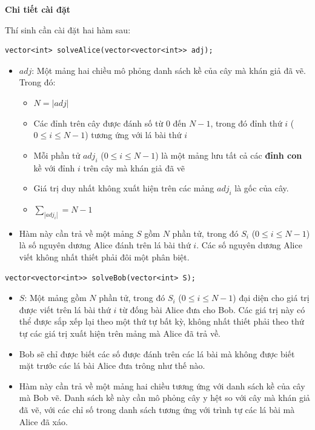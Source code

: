 \textbf{Chi tiết cài đặt}

Thí sinh cần cài đặt hai hàm sau:

\begin{lstlisting}
vector<int> solveAlice(vector<vector<int>> adj);
\end{lstlisting}

\begin{itemize}
   \item $adj$: Một mảng hai chiều mô phỏng danh sách kề của cây mà khán giả đã vẽ. Trong đó:
   \begin{itemize}
      \item $N=|adj|$
      \item Các đỉnh trên cây được đánh số từ $0$ đến $N-1$, trong đó đỉnh thứ $i$ ($0\le i\le N-1$) tương ứng với lá bài thứ $i$
      \item Mỗi phần tử $adj_i$ ($0\le i\le N-1$) là một mảng lưu tất cả các \textbf{đỉnh con} kề với đỉnh $i$ trên cây mà khán giả đã vẽ
      \item Giá trị duy nhất không xuất hiện trên các mảng $adj_i$ là gốc của cây.
      \item $\sum_{|adj_i|}=N-1$
   \end{itemize}
   \item Hàm này cần trả về một mảng $S$ gồm $N$ phần tử, trong đó $S_i$ ($0\le i\le N-1$) là số nguyên dương Alice đánh trên lá bài thứ $i$. Các số nguyên dương Alice viết không nhất thiết phải đôi một phân biệt.
\end{itemize}

\begin{lstlisting}
vector<vector<int>> solveBob(vector<int> S);
\end{lstlisting}

\begin{itemize}
   \item $S$: Một mảng gồm $N$ phần tử, trong đó $S_i$ ($0\le i\le N-1$) đại diện cho giá trị được viết trên lá bài thứ $i$ từ đống bài Alice đưa cho Bob. Các giá trị này có thể được sắp xếp lại theo một thứ tự bất kỳ, không nhất thiết phải theo thứ tự các giá trị xuất hiện trên mảng mà Alice đã trả về.
   \item Bob sẽ chỉ được biết các số được đánh trên các lá bài mà không được biết mặt trước các lá bài Alice đưa trông như thế nào.
   \item Hàm này cần trả về một mảng hai chiều tương ứng với danh sách kề của cây mà Bob vẽ. Danh sách kề này cần mô phỏng cây y hệt so với cây mà khán giả đã vẽ, với các chỉ số trong danh sách tương ứng với trình tự các lá bài mà Alice đã xáo.
\end{itemize}

